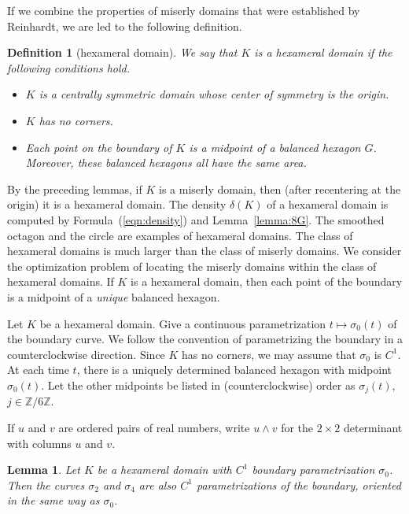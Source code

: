 \documentclass[11pt]{amsart}
\newtheorem{definition}{Definition}
\newtheorem{lemma}{Lemma}
\newcommand{\ring}[1]{\mathbb{#1}}
\def\deltalat{\mathbb\delta}  %
\def\rZ{{\ring{Z}}}
\begin{document}
If we combine the properties of miserly domains that were established by Reinhardt, we are led to the following definition.

\begin{definition}[hexameral domain]
We say that $K$ is a hexameral domain if the following conditions hold.
\begin{itemize}
\item $K$ is a centrally symmetric domain whose center of symmetry is the origin.
\item $K$ has no corners.
\item Each point on
the boundary of $K$ is a midpoint of a balanced
hexagon $G$.  Moreover, these balanced hexagons all have the same area.
\end{itemize}
\end{definition}

By the preceding lemmas, if $K$ is a miserly domain, then (after recentering at the origin) it is a hexameral domain.  The density $\deltalat(K)$ of a hexameral domain is computed by Formula~(\ref{eqn:density})
and Lemma~\ref{lemma:8G}.
The smoothed octagon and the
circle are examples of hexameral domains. 
The
class of hexameral domains is much larger than the class of
miserly domains.  We consider the optimization problem
of locating the miserly domains within the class of
hexameral domains.  If $K$ is a hexameral domain,
then each point of the boundary is a midpoint of a {\it unique} balanced hexagon. 

Let $K$ be a hexameral domain.   Give a continuous
parametrization $t\mapsto\sigma_0(t)$ of the boundary curve. 
We follow the convention of parametrizing the boundary in
a counterclockwise direction.
Since $K$ has no corners, we may assume that $\sigma_0$ is $C^1$.
At each time $t$, there is a uniquely determined balanced hexagon
with midpoint $\sigma_0(t)$. Let the other midpoints be 
listed in (counterclockwise) order
 as $\sigma_j(t)$, $j\in\rZ/6\rZ$.

If $u$ and $v$ are ordered pairs of real numbers, write
$u\land v$ for the $2\times 2$ determinant with columns $u$ and $v$.


\begin{lemma} Let $K$ be a hexameral domain with $C^1$ boundary
parametrization $\sigma_0$.  Then the curves $\sigma_2$ and $\sigma_4$
are also $C^1$ parametrizations of the boundary, oriented in the same
way as $\sigma_0$.
\end{lemma}
\end{document}
